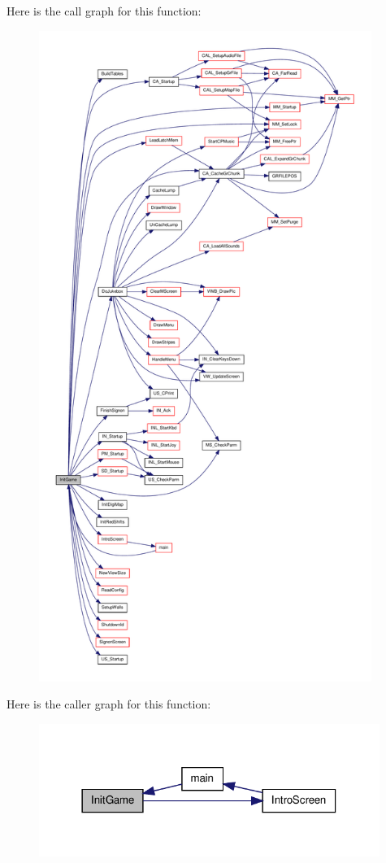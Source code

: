Here is the call graph for this function:
\nopagebreak
\begin{figure}[H]
\begin{center}
\leavevmode
\includegraphics[height=600pt]{WL__MAIN_8C_ad05ce539d29b849ef066482e2284a93f_cgraph}
\end{center}
\end{figure}




Here is the caller graph for this function:
\nopagebreak
\begin{figure}[H]
\begin{center}
\leavevmode
\includegraphics[width=314pt]{WL__MAIN_8C_ad05ce539d29b849ef066482e2284a93f_icgraph}
\end{center}
\end{figure}


